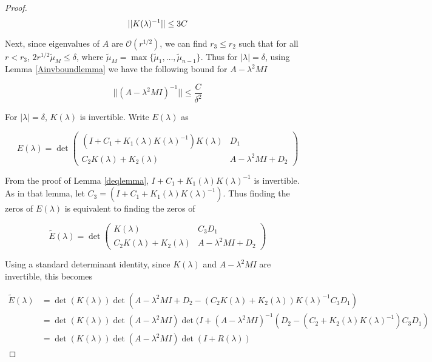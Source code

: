 \documentclass[thesis.tex]{subfiles}
\begin{document}
\begin{lemma}
\begin{proof}
\[
||K(\lambda)^{-1}|| \leq 3 C \\
\]

Next, since eigenvalues of $A$ are $\mathcal{O}(r^{1/2})$, we can find $r_3 \leq r_2$ such that for all $r < r_3$, $2 r^{1/2} \tilde{\mu}_M \leq \delta$, where $\tilde{\mu}_M = \max\{\tilde{\mu}_1, \dots, \tilde{\mu}_{n-1} \}$. Thus for $|\lambda| = \delta$, using Lemma \ref{Ainvboundlemma} we have the following bound for $A - \lambda^2 M I$

\begin{equation*}
||(A - \lambda^2 M I)^{-1}|| \leq \frac{C}{\delta^2}
\end{equation*}

For $|\lambda| = \delta$, $K(\lambda)$ is invertible. Write $E(\lambda)$ as

\begin{equation}
E(\lambda) = \det 
\begin{pmatrix}
(I + C_1 + K_1(\lambda)K(\lambda)^{-1})K(\lambda) & D_1 \\
C_2 K(\lambda) + K_2(\lambda) & A - \lambda^2 MI + D_2
\end{pmatrix}
\end{equation}

From the proof of Lemma \ref{deqlemma}, $I + C_1 + K_1(\lambda)K(\lambda)^{-1}$ is invertible. As in that lemma, let $C_3 = (I + C_1 + K_1(\lambda)K(\lambda)^{-1})$. Thus finding the zeros of $E(\lambda)$ is equivalent to finding the zeros of

\begin{equation}
\tilde{E}(\lambda) = \det 
\begin{pmatrix}
K(\lambda) & C_3 D_1 \\
C_2 K(\lambda) + K_2(\lambda) & A - \lambda^2 MI + D_2
\end{pmatrix}
\end{equation}

Using a standard determinant identity, since $K(\lambda)$ and $A - \lambda^2 M I$ are invertible, this becomes

\begin{align*}
\tilde{E}(\lambda) &= \det(K(\lambda))
\det ( A - \lambda^2 MI + D_2 - (C_2 K(\lambda) + K_2(\lambda))K(\lambda)^{-1}C_3 D_1 ) \\
&= \det(K(\lambda))\det(A - \lambda^2 MI)
\det ( I + (A - \lambda^2 MI)^{-1}(D_2 - (C_2 + K_2(\lambda)K(\lambda)^{-1})C_3 D_1 ) \\
&= \det(K(\lambda))\det(A - \lambda^2 MI)\det(I + R(\lambda))
\end{align*}


\end{proof}
\end{lemma}
\end{document}
